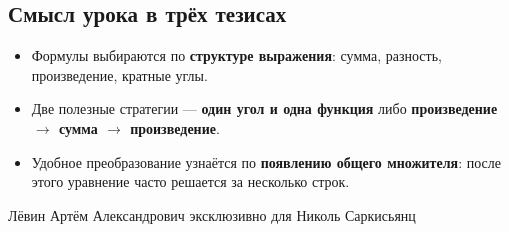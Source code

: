 \documentclass[a4paper,12pt]{article}
\newcommand{\subheading}[1]{\subsection*{\color{accent}#1}}
\begin{document}
\vspace{12mm}
\subheading{Смысл урока в трёх тезисах}
\begin{itemize}
\item Формулы выбираются по \textbf{структуре выражения}: сумма, разность, произведение, кратные углы.
\item Две полезные стратегии --- \textbf{один угол и одна функция} либо \textbf{произведение $\rightarrow$ сумма $\rightarrow$ произведение}.
\item Удобное преобразование узнаётся по \textbf{появлению общего множителя}: после этого уравнение часто решается за несколько строк.
\end{itemize}
\vfill
{\centering\color{textgray}\footnotesize Лёвин Артём Александрович эксклюзивно для Николь Саркисьянц\par}
\end{document}
